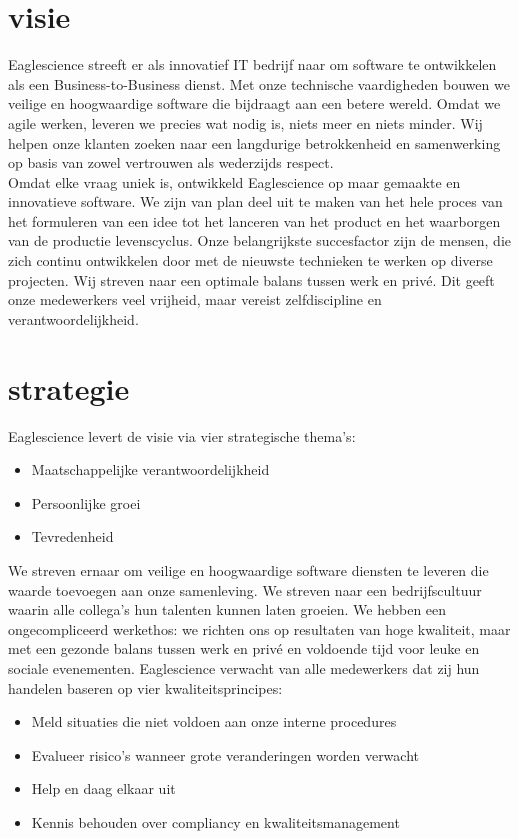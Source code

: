 \section{visie}
Eaglescience streeft er als innovatief IT bedrijf naar om software te ontwikkelen als een Business-to-Business dienst. Met onze technische vaardigheden bouwen we veilige en hoogwaardige software die bijdraagt aan een betere wereld. Omdat we agile werken, leveren we precies wat nodig is, niets meer en niets minder. Wij helpen onze klanten zoeken naar een langdurige betrokkenheid en samenwerking op basis van zowel vertrouwen als wederzijds respect. \\
Omdat elke vraag uniek is, ontwikkeld Eaglescience op maar gemaakte en innovatieve software. We zijn van plan deel uit te maken van het hele proces van het formuleren van een idee tot het lanceren van het product en het waarborgen van de productie levenscyclus. Onze belangrijkste succesfactor zijn de mensen, die zich continu ontwikkelen door met de nieuwste technieken te werken op diverse projecten. Wij streven naar een optimale balans tussen werk en priv\'e. Dit geeft onze medewerkers veel vrijheid, maar vereist zelfdiscipline en verantwoordelijkheid. 

\section{strategie}
Eaglescience levert de visie via vier strategische thema's:
\begin{itemize}
\item Maatschappelijke verantwoordelijkheid
\item Persoonlijke groei
\item Tevredenheid
\end{itemize}
We streven ernaar om veilige en hoogwaardige software diensten te leveren die waarde toevoegen aan onze samenleving. We streven naar een bedrijfscultuur waarin alle collega's hun talenten kunnen laten groeien. We hebben een ongecompliceerd werkethos: we richten ons op resultaten van hoge kwaliteit, maar met een gezonde balans tussen werk en priv\'e en voldoende tijd voor leuke en sociale evenementen. Eaglescience verwacht van alle medewerkers dat zij hun handelen baseren op vier kwaliteitsprincipes:
\begin{itemize}
\item Meld situaties die niet voldoen aan onze interne procedures
\item Evalueer risico's wanneer grote veranderingen worden verwacht
\item Help en daag elkaar uit
\item Kennis behouden over compliancy en kwaliteitsmanagement
\end{itemize} 


